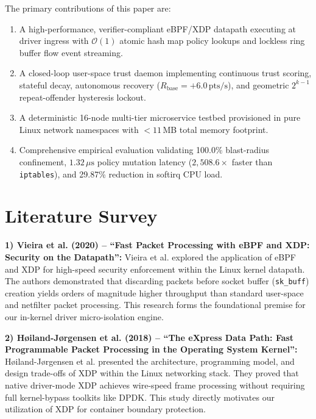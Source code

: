 \documentclass[conference]{IEEEtran}
\begin{document}
The primary contributions of this paper are:
\begin{enumerate}
    \item A high-performance, verifier-compliant eBPF/XDP datapath executing at driver ingress with $\mathcal{O}(1)$ atomic hash map policy lookups and lockless ring buffer flow event streaming.
    \item A closed-loop user-space trust daemon implementing continuous trust scoring, stateful decay, autonomous recovery ($R_{\text{base}} = +6.0\,\text{pts/s}$), and geometric $2^{k-1}$ repeat-offender hysteresis lockout.
    \item A deterministic 16-node multi-tier microservice testbed provisioned in pure Linux network namespaces with $<11$\,MB total memory footprint.
    \item Comprehensive empirical evaluation validating 100.0\% blast-radius confinement, $1.32\,\mu\text{s}$ policy mutation latency ($2,508.6\times$ faster than \texttt{iptables}), and 29.87\% reduction in softirq CPU load.
\end{enumerate}

\section{Literature Survey}
\noindent
\textbf{1) Vieira et al. (2020) -- ``Fast Packet Processing with eBPF and XDP: Security on the Datapath'':} 
Vieira et al. explored the application of eBPF and XDP for high-speed security enforcement within the Linux kernel datapath. The authors demonstrated that discarding packets before socket buffer (\texttt{sk\_buff}) creation yields orders of magnitude higher throughput than standard user-space and netfilter packet processing. This research forms the foundational premise for our in-kernel driver micro-isolation engine.

\noindent
\textbf{2) H{\o}iland-J{\o}rgensen et al. (2018) -- ``The eXpress Data Path: Fast Programmable Packet Processing in the Operating System Kernel'':} 
H{\o}iland-J{\o}rgensen et al. presented the architecture, programming model, and design trade-offs of XDP within the Linux networking stack. They proved that native driver-mode XDP achieves wire-speed frame processing without requiring full kernel-bypass toolkits like DPDK. This study directly motivates our utilization of XDP for container boundary protection.
\end{document}
